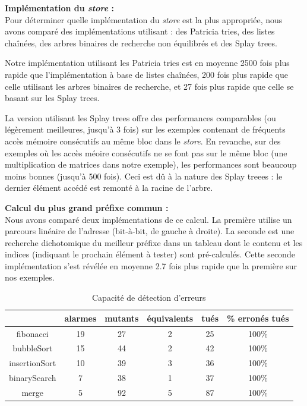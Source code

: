 \textbf{Implémentation du {\em store} :}\\
Pour déterminer quelle implémentation du {\em store} est la plus appropriée,
nous avons comparé des implémentations utilisant : des Patricia tries, des
listes chaînées, des arbres binaires de recherche non équilibrés et des Splay
trees.

Notre implémentation utilisant les Patricia tries est en moyenne 2500 fois plus
rapide que l'implémentation à base de listes chaînées, 200 fois plus rapide que
celle utilisant les arbres binaires de recherche, et 27 fois plus rapide que
celle se basant sur les Splay trees.

La version utilisant les Splay trees offre des performances comparables (ou
légèrement meilleures, jusqu'à 3 fois) sur les exemples contenant de fréquents
accès mémoire consécutifs au même bloc dans le {\em store}.
En revanche, sur des exemples où les accès méoire consécutifs ne se font pas sur
le même bloc (une multiplication de matrices dans notre exemple), les
performances sont beaucoup moins bonnes (jusqu'à 500 fois).
Ceci est dû à la nature des Splay treees : le dernier élément accédé est remonté
à la racine de l'arbre.

\textbf{Calcul du plus grand préfixe commun :} \\
Nous avons comparé deux implémentations de ce calcul.
La première utilise un parcours linéaire de l'adresse (bit-à-bit, de gauche à
droite).
La seconde est une recherche dichotomique du meilleur préfixe dans un tableau
dont le contenu et les indices (indiquant le prochain élément à tester) sont
pré-calculés.
Cette seconde implémentation s'est révélée en moyenne 2.7 fois plus rapide que
la première sur nos exemples.


\begin{table}[tb]
  \centering
  \begin{tabular}{c|c|c|c|c|c}
    & alarmes & mutants & équivalents & tués & \% erronés tués \\
    \hline
    fibonacci & 19  & 27 & 2 & 25 & 100\% \\
    \hline
    bubbleSort & 15  & 44 & 2 & 42 & 100\% \\
    \hline
    insertionSort & 10  & 39 & 3 & 36 & 100\% \\
    \hline
    binarySearch & 7 & 38 & 1 & 37 & 100\% \\
    \hline
    merge & 5 & 92 & 5 & 87 & 100\% \\
  \end{tabular}
  \caption{Capacité de détection d'erreurs
    \label{tab:mutation-exp}}
\end{table}


